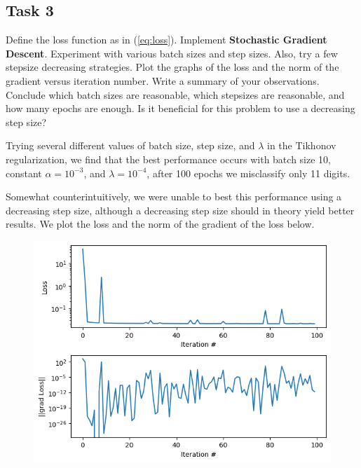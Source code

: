 \documentclass{../kin_math}
\begin{document}
\subsection{Task 3}
Define the loss function as in (\ref{eq:loss}). Implement \textbf{Stochastic Gradient Descent}. Experiment with various batch sizes and step sizes. Also, try a few stepsize decreasing strategies. Plot the graphs of the loss and the norm of the gradient versus iteration number. Write a summary of your observations. Conclude which batch sizes are reasonable, which stepsizes are reasonable, and how many epochs are enough. Is it beneficial for this problem to use a decreasing step size?
\begin{solution}
  Trying several different values of batch size, step size, and $\lambda$ in the Tikhonov regularization, we find that the best performance occurs with batch size 10, constant $\alpha = 10^{-3}$, and $\lambda = 10^{-4}$, after 100 epochs we misclassify only 11 digits.

  Somewhat counterintuitively, we were unable to best this performance using a decreasing step size, although a decreasing step size should in theory yield better results. We plot the loss and the norm of the gradient of the loss below.
  \begin{figure}
    \centering
    \includegraphics[scale=0.8]{sgd.png}
  \end{figure}
\end{solution}
\end{document}
